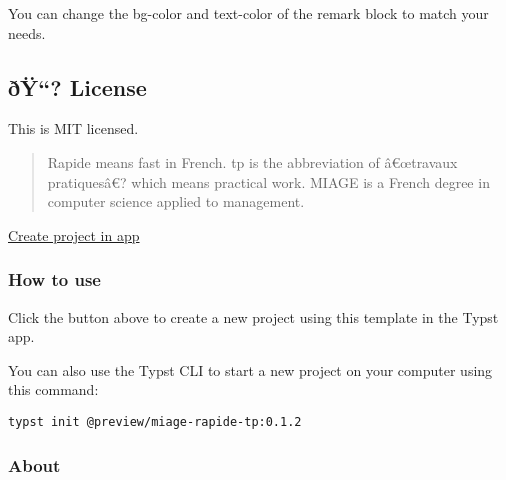 You can change the bg-color and text-color of the remark block to match
your needs.

\subsection{ðŸ``? License}\label{uxf0uxff-license}

This is MIT licensed.

\begin{quote}
Rapide means fast in French. tp is the abbreviation of â€œtravaux
pratiquesâ€? which means practical work. MIAGE is a French degree in
computer science applied to management.
\end{quote}

\href{/app?template=miage-rapide-tp&version=0.1.2}{Create project in
app}

\subsubsection{How to use}\label{how-to-use}

Click the button above to create a new project using this template in
the Typst app.

You can also use the Typst CLI to start a new project on your computer
using this command:

\begin{verbatim}
typst init @preview/miage-rapide-tp:0.1.2
\end{verbatim}



\subsubsection{About}\label{about}


